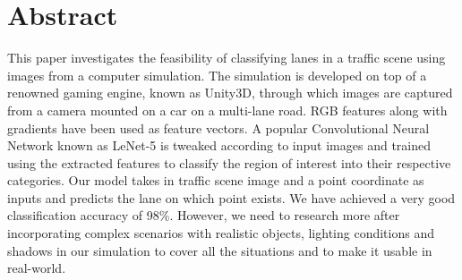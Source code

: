 \chapter*{Abstract}
This paper investigates the feasibility of classifying lanes in a traffic scene using images from a computer simulation. The simulation is developed on top of a renowned gaming engine, known as Unity3D, through which images are captured from a camera mounted on a car on a multi-lane road. RGB features along with gradients have been used as feature vectors. A popular Convolutional Neural Network known as LeNet-5 is tweaked according to input images and trained using the extracted features to classify the region of interest into their respective categories. Our model takes in traffic scene image and a point coordinate as inputs and predicts the lane on which point exists. We have achieved a very good classification accuracy of 98\%. However, we need to research more after incorporating complex scenarios with realistic objects, lighting conditions and shadows in our simulation to cover all the situations and to make it usable in real-world.

